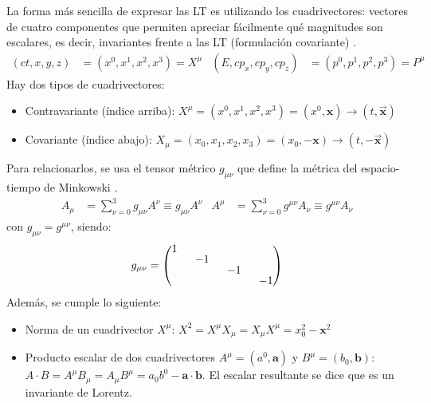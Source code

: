 La forma más sencilla de expresar las LT es utilizando los cuadrivectores: vectores de cuatro componentes que permiten apreciar fácilmente qué magnitudes son escalares, es decir, invariantes frente a las LT (formulación covariante) \cite{MCR}.
\begin{align}
(ct,x, y, z) &=(x^0, x^1, x^2, x^3)=X^\mu & (E,cp_x, cp_y, cp_z) &=(p^0, p^1, p^2, p^3)=P^\mu
\end{align}
Hay dos tipos de cuadrivectores:
\begin{itemize}
\item Contravariante (índice arriba): $X^\mu=(x^0, x^1, x^2, x^3)=(x^0,\textbf{x}) \rightarrow (t,\vec{\boldsymbol{x}})$
\item Covariante (índice abajo): $X_\mu=(x_0, x_1, x_2, x_3)=(x_0,-\textbf{x}) \rightarrow (t,-\vec{\boldsymbol{x}})$
\end{itemize} 
Para relacionarlos, se usa el tensor métrico $g_{\mu\nu}$ que define la métrica del espacio-tiempo de Minkowski \cite{MCR}.
\begin{align}
A_{\mu } &=\sum ^{3}_{\nu =0}g_{\mu \nu }A^{\nu} \equiv g_{\mu \nu }A^{\nu} & A^{\mu } &=\sum ^{3}_{\nu =0}g^{\mu \nu }A_{\nu} \equiv g^{\mu \nu }A_{\nu} \label{eq:metrica}
\end{align}
con $g_{\mu\nu} = g^{\mu\nu}$, siendo:
\begin{equation*}
g_{\mu\nu} = 
\begingroup 
\renewcommand*{\arraystretch}{0.8}
\setlength\arraycolsep{8pt}
\begin{pmatrix}
1 & & &  \\
& -1 & & \\
& & -1 & \\
& & & -1
\end{pmatrix}
\endgroup
\end{equation*}
Además, se cumple lo siguiente:
\begin{itemize}
\item Norma de un cuadrivector $X^\mu$: $X^{2}=X^{\mu }X_{\mu }=X_{\mu }X^{\mu }=x_{0}^{2}-\boldsymbol{x}^{2}$
\item Producto escalar de dos cuadrivectores $A^{\mu}=\left( a^{0},\boldsymbol{a}\right)$ y $B^{\mu}=\left( b_{0},\boldsymbol{b}\right)$: $A\cdot B=A^{\mu }B_{\mu }=A_{\mu }B^{\mu }=a_{0}b^{0}- \boldsymbol{a}\cdot \boldsymbol{b}$. El escalar resultante se dice que es un invariante de Lorentz.
\end{itemize}

